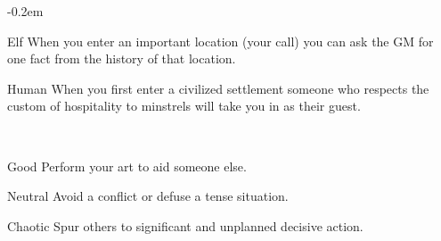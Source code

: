 \documentclass[8pt]{extarticle}
\begin{document}
\openup -0.2em

\charbanner

\begin{minipage}[t]{3.2in}


\begin{optfeature}{Elf}
  When you enter an important location (your call) you can ask the GM
  for one fact from the history of that location.
\end{optfeature}

\begin{optfeature}{Human}
  When you first enter a civilized settlement someone who respects the
  custom of hospitality to minstrels will take you in as their guest.
\end{optfeature}

\


\begin{optfeature}{Good}
  Perform your art to aid someone else.
\end{optfeature}

\begin{optfeature}{Neutral}
  Avoid a conflict or defuse a tense situation.
\end{optfeature}

\begin{optfeature}{Chaotic}
  Spur others to significant and unplanned decisive action.
\end{optfeature}

\

\vfill\null

\end{minipage}
\end{document}
